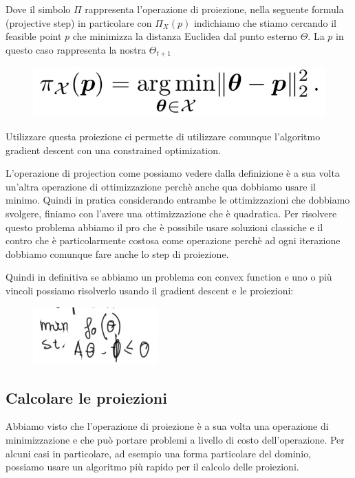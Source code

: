 \documentclass[14pt]{extreport}
\begin{document}
Dove il simbolo $\Pi$ rappresenta l'operazione di proiezione, nella seguente formula (projective step) in particolare con $\Pi_X(p)$ indichiamo che
stiamo cercando il feasible point $p$ che minimizza la distanza Euclidea dal punto esterno $\Theta$. La $p$ in questo caso rappresenta la nostra
$\Theta_{t+1}$

\begin{figure}[H]
\centering
\includegraphics[width=0.5\linewidth]{285.jpeg}
\end{figure}


Utilizzare questa proiezione ci permette di utilizzare comunque l'algoritmo gradient descent con una constrained optimization.

L'operazione di projection come possiamo vedere dalla definizione è a sua volta un'altra operazione di ottimizzazione perchè anche qua dobbiamo usare
il minimo. Quindi in pratica considerando entrambe le ottimizzazioni che dobbiamo svolgere, finiamo con l'avere una ottimizzazione che è quadratica.
Per risolvere questo problema abbiamo il pro che è possibile usare soluzioni classiche e il contro che è particolarmente costosa come operazione
perchè ad ogni iterazione dobbiamo comunque fare anche lo step di proiezione.

Quindi in definitiva se abbiamo un problema con convex function e uno o più vincoli possiamo risolverlo usando il gradient descent e le proiezioni:

\begin{figure}[H]
\centering
\includegraphics[width=0.4\linewidth]{286.jpeg}
\end{figure}


\subsection{Calcolare le proiezioni}

Abbiamo visto che l'operazione di proiezione è a sua volta una operazione di minimizzazione e che può portare problemi a livello di costo
dell'operazione. Per alcuni casi in particolare, ad esempio una forma particolare del dominio, possiamo usare un algoritmo più rapido per il calcolo
delle proiezioni.
\end{document}
